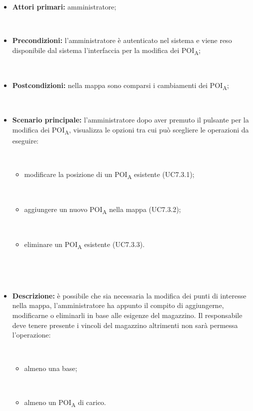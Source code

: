 \begin{itemize}

​    \item   \textbf{Attori primari:} amministratore;

​    \item   \textbf{Precondizioni:} l'amministratore è autenticato nel sistema e viene reso disponibile dal sistema l'interfaccia per la modifica dei POI\textsubscript{A};

​    \item   \textbf{Postcondizioni:} nella mappa sono comparsi i cambiamenti dei POI\textsubscript{A}; 

​    \item   \textbf{Scenario principale:} l'amministratore dopo aver premuto il pulsante per la modifica dei POI\textsubscript{A}, visualizza le opzioni tra cui può scegliere le operazioni da eseguire:

​    \begin{itemize}

​        \item modificare la posizione di un POI\textsubscript{A} esistente (UC7.3.1);

​        \item aggiungere un nuovo POI\textsubscript{A} nella mappa (UC7.3.2);

​        \item eliminare un POI\textsubscript{A} esistente (UC7.3.3).

​    \end{itemize}

​    \item   \textbf{Descrizione:} è possibile che sia necessaria la modifica dei punti di interesse nella mappa, l'amministratore ha appunto il compito di aggiungerne, modificarne o eliminarli in base alle esigenze del magazzino. Il responsabile deve tenere presente i vincoli del magazzino altrimenti non sarà permessa l'operazione:

​    \begin{itemize}

​        \item almeno una base;

​        \item almeno un POI\textsubscript{A} di carico.

​    \end{itemize}

\end{itemize}



